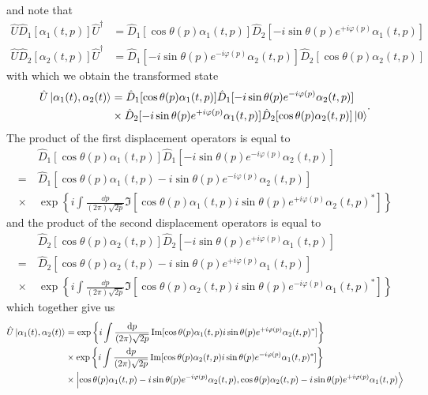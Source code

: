 and note that
\begin{align}
	\hat{U}
	\hat{D}_1[\alpha_1(t,p)]
	\hat{U}^\dagger
	&=
	\hat{D}_1[\cos\theta(p)\alpha_1(t,p)]
	\hat{D}_2[-i\sin\theta(p)e^{+i\varphi(p)}\alpha_1(t,p)]
	\\
	\hat{U}
	\hat{D}_2[\alpha_2(t,p)]
	\hat{U}^\dagger
	&=
	\hat{D}_1[-i\sin\theta(p)e^{-i\varphi(p)}\alpha_2(t,p)]
	\hat{D}_2[\cos\theta(p)\alpha_2(t,p)]
\end{align}
with which we obtain the transformed state
\begin{equation}
	\begin{split}
		\hat{U}
		\ket{\alpha_1(t),\alpha_2(t)}
		&=
		\hat{D}_1[\cos\theta(p)\alpha_1(t,p)]
		\hat{D}_1[-i\sin\theta(p)e^{-i\varphi(p)}\alpha_2(t,p)]
		\\
		&\times
		\hat{D}_2[-i\sin\theta(p)e^{+i\varphi(p)}\alpha_1(t,p)]
		\hat{D}_2[\cos\theta(p)\alpha_2(t,p)]
		\ket{0}
	\end{split}
	.
\end{equation}
The product of the first displacement operators is equal to
\begin{equation}
	\begin{split}
		&\
		\hat{D}_1[\cos\theta(p)\alpha_1(t,p)]
		\hat{D}_1[-i\sin\theta(p)e^{-i\varphi(p)}\alpha_2(t,p)]
		\\
		=&\
		\hat{D}_1[\cos\theta(p)\alpha_1(t,p)-i\sin\theta(p)e^{-i\varphi(p)}\alpha_2(t,p)]
		\\
		\times &\
		\exp\left\{
			i\int\frac{\dd{p}}{(2\pi)\sqrt{2p}}
			\Im[
				\cos\theta(p)\alpha_1(t,p)
				i\sin\theta(p)e^{+i\varphi(p)}\alpha_2(t,p)^*
			]
		\right\}
	\end{split}
\end{equation}
and the product of the second displacement operators is equal to
\begin{equation}
	\begin{split}
		&\
		\hat{D}_2[\cos\theta(p)\alpha_2(t,p)]
		\hat{D}_2[-i\sin\theta(p)e^{+i\varphi(p)}\alpha_1(t,p)]
		\\
		=&\
		\hat{D}_2[\cos\theta(p)\alpha_2(t,p)-i\sin\theta(p)e^{+i\varphi(p)}\alpha_1(t,p)]
		\\
		\times &\
		\exp\left\{
			i\int\frac{\dd{p}}{(2\pi)\sqrt{2p}}
			\Im[
				\cos\theta(p)\alpha_2(t,p)
				i\sin\theta(p)e^{-i\varphi(p)}\alpha_1(t,p)^*
			]
		\right\}
	\end{split}
\end{equation}
which together give us
\begin{equation}
	\begin{split}
		\hat{U}
		\ket{\alpha_1(t),\alpha_2(t)}
		&=
		\exp\left\{
			i\int\frac{\dd{p}}{(2\pi)\sqrt{2p}}
			\operatorname{\operatorname{Im}}[
				\cos\theta(p)\alpha_1(t,p)
				i\sin\theta(p)e^{+i\varphi(p)}\alpha_2(t,p)^*
			]
		\right\}
		\\
		&\times
		\exp\left\{
			i\int\frac{\dd{p}}{(2\pi)\sqrt{2p}}
			\operatorname{\operatorname{Im}}[
				\cos\theta(p)\alpha_2(t,p)
				i\sin\theta(p)e^{-i\varphi(p)}\alpha_1(t,p)^*
			]
		\right\}
		\\
		&\times
		\ket{\cos\theta(p)\alpha_1(t,p)-i\sin\theta(p)e^{-i\varphi(p)}\alpha_2(t,p),
			\cos\theta(p)\alpha_2(t,p)-i\sin\theta(p)e^{+i\varphi(p)}\alpha_1(t,p)}
	\end{split}
\end{equation}